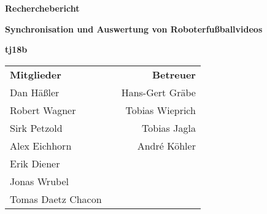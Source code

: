 \begin{titlepage}
	\begin{center}
		{\Huge\textbf{Recherchebericht}\\\hrulefill\vspace{1em}}
		
		{\Large\textbf{Synchronisation und Auswertung von Roboterfußballvideos}\vspace{1em}}

		{\textbf{tj18b}\vspace{1em}}
		
		\vspace*{\fill} 
		
		\begin{table}[b]
			\begin{tabularx}{\textwidth}{lXr}
				\textbf{Mitglieder}&&\textbf{Betreuer}\\
				Dan Häßler&&Hans-Gert Gräbe\\
				Robert Wagner&&Tobias Wieprich\\
				Sirk Petzold&&Tobias Jagla\\
				Alex Eichhorn&&André Köhler\\
				Erik Diener&&\\
				Jonas Wrubel&&\\
				Tomas Daetz Chacon&&\\
			\end{tabularx}
		\end{table}
		
	\end{center}
\end{titlepage}